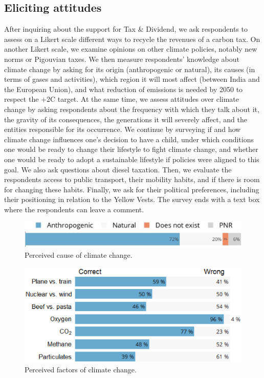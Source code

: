 \documentclass[english,5p,authoryear]{elsarticle}
\begin{document}
    \subsection{Eliciting attitudes} %


After inquiring about the support for Tax \& Dividend, we ask respondents to assess on a Likert scale different ways to recycle the revenues of a carbon tax. On another Likert scale, we examine opinions on other climate policies, notably new norms or Pigouvian taxes. We then measure respondents' knowledge about climate change by asking for its origin (anthropogenic or natural), its causes (in terms of gases and activities), which region it will most affect (between India and the European Union), and what reduction of emissions is needed by 2050 to respect the +2\textdegree{}C target. At the same time, we assess attitudes over climate change by asking respondents about the frequency with which they talk about it, the gravity of its consequences, the generations it will severely affect, and the entities responsible for its occurrence. We continue by surveying if and how climate change influences one's decision to have a child, under which conditions one would be ready to change their lifestyle to fight climate change, and whether one would be ready to adopt a sustainable lifestyle if policies were aligned to this goal. We also ask questions about diesel taxation. Then, we evaluate the respondents access to public transport, their mobility habits, and if there is room for changing these habits. Finally, we ask for their political preferences, including their positioning in relation to the Yellow Vests. The survey ends with a text box where the respondents can leave a comment.
%
%
%

\begin{figure}[b]
\centering
\includegraphics[width=\columnwidth]{Images_EPS/CC_cause_nolegend2.eps}
\caption{Perceived cause of climate change.}
\label{fig:cause}
\end{figure}

\begin{figure}[t]
\centering
\includegraphics[width=\columnwidth]{Images_EPS/CC_knowledge_valbtr.eps}
\caption{Perceived factors of climate change.}
\label{fig:factors}
\end{figure}
\end{document}
